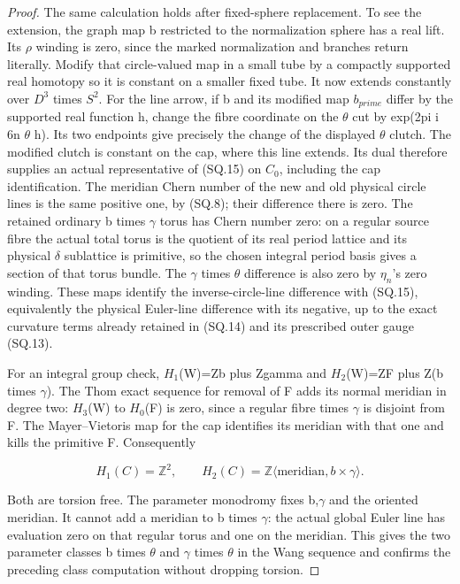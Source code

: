 \begin{proof}
The same calculation holds after fixed-sphere replacement. To see the
extension, the graph map b restricted to the normalization sphere has
a real lift. Its \(\rho\) winding is zero, since the marked normalization
and branches return literally. Modify that circle-valued map in a
small tube by a compactly supported real homotopy so it is constant
on a smaller fixed tube. It now extends constantly over \(D^{3}\) times \(S^{2}\).
For the line arrow, if b and its modified map \(b_{prime}\) differ by the
supported real function h, change the fibre coordinate on the \(\theta\)
cut by exp(2pi i 6n \(\theta\) h). Its two endpoints give precisely the
change of the displayed \(\theta\) clutch. The modified clutch is constant
on the cap, where this line extends. Its dual therefore supplies an actual
representative of (SQ.15) on \(C_{0}\), including the cap identification. The
meridian Chern number of the new and old physical circle lines is
the same positive one, by (SQ.8); their difference there is zero.
The retained ordinary b times \(\gamma\) torus has Chern number zero:
on a regular source fibre the actual total torus is the quotient of
its real period lattice and its physical \(\delta\) sublattice is primitive,
so the chosen integral period basis gives a section of that torus
bundle. The \(\gamma\) times \(\theta\) difference is also zero by \(\eta_{n}\)'s
zero winding. These maps identify the inverse-circle-line difference with
(SQ.15), equivalently the physical Euler-line difference with its
negative, up to the exact curvature terms already retained in (SQ.14)
and its prescribed outer gauge (SQ.13).

For an integral group check, \(H_{1}\)(W)=Zb plus Zgamma and
\(H_{2}\)(W)=ZF plus Z(b times \(\gamma\)). The Thom exact sequence for removal
of F adds its normal meridian in degree two: \(H_{3}\)(W) to \(H_{0}\)(F) is
zero, since a regular fibre times \(\gamma\) is disjoint from F. The
Mayer--Vietoris map for the cap identifies its meridian with that
one and kills the primitive F. Consequently

\[
 H_1(C)=\mathbb Z^2,\qquad
 H_2(C)=\mathbb Z\langle\text{meridian},b\times\gamma\rangle.
                                                        \tag{SQ.16}
\]

Both are torsion free. The parameter monodromy fixes b,\(\gamma\) and
the oriented meridian. It cannot add a meridian to b times \(\gamma\):
the actual global Euler line has evaluation zero on that regular
torus and one on the meridian. This gives the two parameter classes
b times \(\theta\) and \(\gamma\) times \(\theta\) in the Wang sequence and
confirms the preceding class computation without dropping torsion.


\end{proof}
